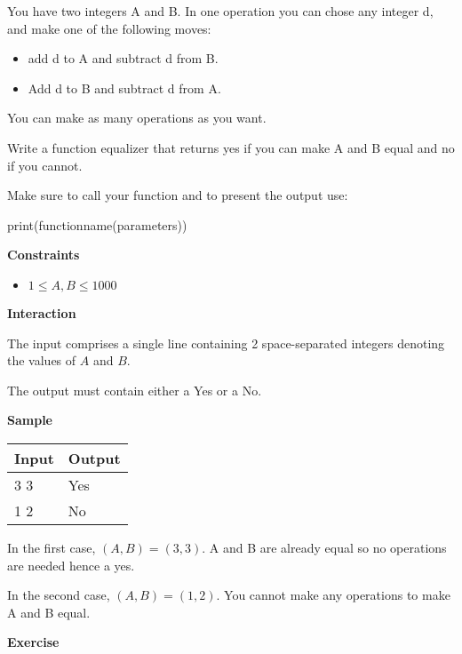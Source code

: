 \documentclass[a4paper]{exam}
\newcommand\heading[1]{\textbf{#1}}
\newcommand\alert[2]{\centerline{\textbf\large{\underline{\color{#1}{#2}}}}}
\begin{document}
\begin{questions}
\begin{enumerate}
\alert{Green} {This means the applied logic is correct}
\end{enumerate}
  



    You have two integers A and B. In one operation you can chose any integer d, and make one of the following moves:
    \begin{itemize}
        \item add d to A and subtract d from B.
        \item Add d to B and subtract d from A.
    \end{itemize}

    You can make as many operations as you want.

    Write a function equalizer that returns yes if you can make A and B equal and no if you cannot.


    Make sure to call your function and to present the output use:

    print(functionname(parameters))

    \heading{Constraints}
    \begin{itemize}
        \item $ 1 \leq A,B \le 1000 $

    \end{itemize}

    \heading{Interaction}

    The input comprises a single line containing 2 space-separated integers denoting the values of $A$ and $B$.

    The output must contain either a Yes or a No.

    \heading{Sample}

    \begin{tabularx}{\textwidth}{|X|X|}
        \rowcolor{gray!50}
        \hline
        Input & Output \\ \hline\hline
        3 3   & Yes    \\\hline
        1 2   & No     \\\hline
    \end{tabularx}

    In the first case, $(A,B)=(3,3)$. A and B are already equal so no operations are needed hence a yes.

    In the second case, $(A,B)=(1,2)$. You cannot make any operations to make A and B equal.

   
    \heading{Exercise}


\end{questions}
\end{document}
